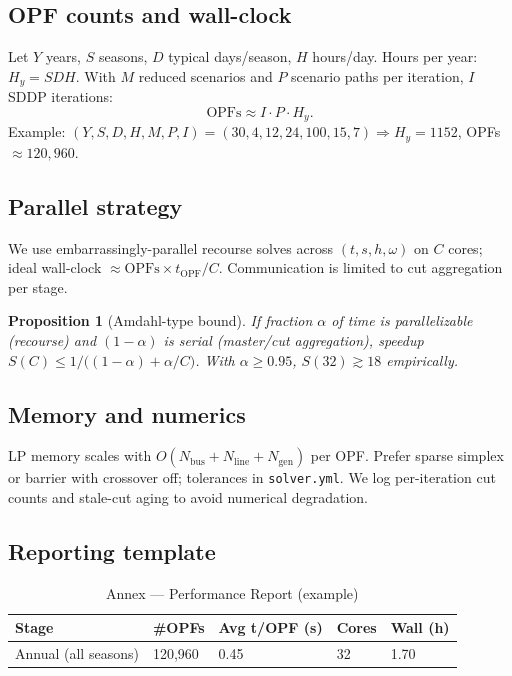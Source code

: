 \documentclass[11pt]{article}
\numberwithin{equation}{section}
\newtheorem{proposition}{Proposition}[section]
\theoremstyle{definition}
\theoremstyle{remark}
\begin{document}
\subsection{ OPF counts and wall-clock}
Let $Y$ years, $S$ seasons, $D$ typical days/season, $H$ hours/day. Hours per year: $H_y=SDH$. With $M$ reduced scenarios and $P$ scenario paths per iteration, $I$ SDDP iterations:
\[
\text{OPFs} \approx I \cdot P \cdot H_y.
\]
Example: $(Y,S,D,H,M,P,I)=(30,4,12,24,100,15,7)\Rightarrow H_y=1152$, OPFs $\approx 120{,}960$.

\subsection{ Parallel strategy}
We use embarrassingly-parallel recourse solves across $(t,s,h,\omega)$ on $C$ cores; ideal wall-clock $\approx \text{OPFs}\times t_{\mathrm{OPF}}/C$. Communication is limited to cut aggregation per stage.

\begin{proposition}[Amdahl-type bound]
If fraction $\alpha$ of time is parallelizable (recourse) and $(1-\alpha)$ is serial (master/cut aggregation), speedup $S(C)\le 1/\big((1-\alpha)+\alpha/C\big)$. With $\alpha\ge 0.95$, $S(32)\gtrsim 18$ empirically.
\end{proposition}

\subsection{ Memory and numerics}
LP memory scales with $O(N_{\text{bus}}+N_{\text{line}}+N_{\text{gen}})$ per OPF. Prefer sparse simplex or barrier with crossover off; tolerances in \texttt{solver.yml}. We log per-iteration cut counts and stale-cut aging to avoid numerical degradation.

\subsection{ Reporting template}
\begin{table}[h]
\centering
\caption{Annex — Performance Report (example)}
\begin{tabular}{@{}lllll@{}}
\toprule
\textbf{Stage} & \textbf{\#OPFs} & \textbf{Avg t/OPF (s)} & \textbf{Cores} & \textbf{Wall (h)} \\
\midrule
Annual (all seasons) & 120{,}960 & 0.45 & 32 & 1.70 \\
\bottomrule
\end{tabular}
\end{table}
\end{document}
